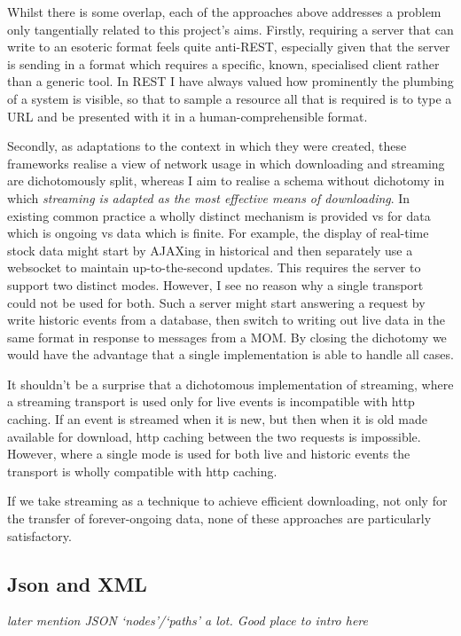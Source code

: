 \documentclass[]{article}
\begin{document}
Whilst there is some overlap, each of the approaches above addresses a
problem only tangentially related to this project's aims. Firstly,
requiring a server that can write to an esoteric format feels quite
anti-REST, especially given that the server is sending in a format which
requires a specific, known, specialised client rather than a generic
tool. In REST I have always valued how prominently the plumbing of a
system is visible, so that to sample a resource all that is required is
to type a URL and be presented with it in a human-comprehensible format.

Secondly, as adaptations to the context in which they were created,
these frameworks realise a view of network usage in which downloading
and streaming are dichotomously split, whereas I aim to realise a schema
without dichotomy in which \emph{streaming is adapted as the most
effective means of downloading}. In existing common practice a wholly
distinct mechanism is provided vs for data which is ongoing vs data
which is finite. For example, the display of real-time stock data might
start by AJAXing in historical and then separately use a websocket to
maintain up-to-the-second updates. This requires the server to support
two distinct modes. However, I see no reason why a single transport
could not be used for both. Such a server might start answering a
request by write historic events from a database, then switch to writing
out live data in the same format in response to messages from a MOM. By
closing the dichotomy we would have the advantage that a single
implementation is able to handle all cases.

It shouldn't be a surprise that a dichotomous implementation of
streaming, where a streaming transport is used only for live events is
incompatible with http caching. If an event is streamed when it is new,
but then when it is old made available for download, http caching
between the two requests is impossible. However, where a single mode is
used for both live and historic events the transport is wholly
compatible with http caching.

If we take streaming as a technique to achieve efficient downloading,
not only for the transfer of forever-ongoing data, none of these
approaches are particularly satisfactory.

\subsection{Json and XML}

\emph{later mention JSON `nodes'/`paths' a lot. Good place to intro
here}
\end{document}
